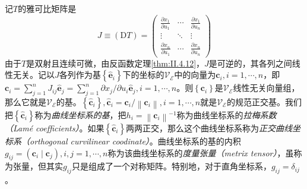 \documentclass[../main.tex]{subfiles}
\begin{document}
记$T$的雅可比矩阵是
\[J\equiv\left(\mathrm{D}T\right)=\left(\begin{array}{ccc}
            \frac{\partial x_1}{\partial u_1} & \cdots & \frac{\partial x_1}{\partial u_n} \\
            \vdots                            & \ddots & \vdots                            \\
            \frac{\partial x_n}{\partial u_1} & \cdots & \frac{\partial x_n}{\partial u_n}
        \end{array}\right)\]
由于$T$是双射且连续可微，由反函数定理\ref{thm:II.4.12}，$J$是可逆的，其各列之间线性无关。记以$J$各列作为基$\left\{\mathbf{\hat{e}}_i\right\}$下的坐标的$\mathcal{V}_{\mathcal{E}}$中的向量为$\mathbf{c}_i,i=1,\cdots,n$，即$\mathbf{c}_i=\sum_{j=1}^n J_{ij}\mathbf{\hat{e}}_j=\sum_{j=1}^n\partial x_j/\partial u_i\mathbf{\hat{e}}_j,i=1,\cdots,n$。则$\left\{\mathbf{c}_i\right\}$是$\mathcal{V}_{\mathcal{E}}$线性无关向量组，那么它就是$\mathcal{V}_{\mathcal{E}}$的基。$\left\{\mathbf{\hat{c}}_i\right\},\mathbf{\hat{c}}_i=\mathbf{c}_i/\left\|\mathbf{c}_i\right\|,i=1,\cdots,n$就是$\mathcal{V}_{\mathcal{E}}$的规范正交基。我们把$\left\{\mathbf{\hat{c}}_i\right\}$称为\emph{曲线坐标系的基}，把$h_i=\left\|\mathbf{c}_i\right\|^{-1}$称为曲线坐标系的\emph{拉梅系数（Lam\'{e} coefficients）}。如果$\left\{\mathbf{\hat{c}}_i\right\}$两两正交，那么这个曲线坐标系称为\emph{正交曲线坐标系（orthogonal curvilinear coodinate）}。曲线坐标系的基的内积$g_{ij}=\left(\mathbf{c}_i\mid\mathbf{c}_j\right),i,j=1,\cdots,n$称为该曲线坐标系的\emph{度量张量（metrix tensor）}，虽称为张量，但其实$g_{ij}$只是组成了一个对称矩阵。特别地，对于直角坐标系，$g_{ij}=\delta_{ij}$。
\end{document}
